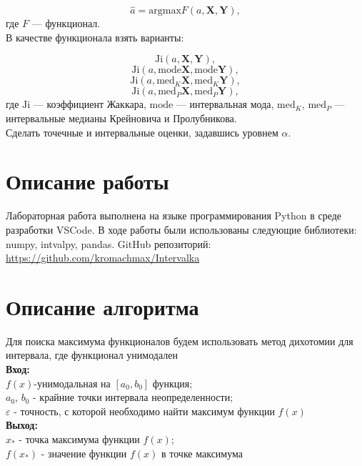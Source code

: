 \documentclass[10pt]{article}
\begin{document}
\begin{equation}
    \hat a = \text{argmax} F(a, \mathbf{X}, \mathbf{Y}),
\end{equation}
где \( F \) --- функционал.
\\
В качестве функционала взять варианты:

  \begin{equation} \label{eq:F_1}
    \text{Ji} (a, \mathbf{X}, \mathbf{Y}),
  \end{equation}
  \begin{equation} \label{eq:F_2}
    \text{Ji} (a, \text{mode} \mathbf{X}, \text{mode} \mathbf{Y}),
  \end{equation}
  \begin{equation} \label{eq:F_3}
    \text{Ji} (a, \text{med}_K \mathbf{X}, \text{med}_K \mathbf{Y}),
  \end{equation}
  \begin{equation} \label{eq:F_4}
    \text{Ji} (a, \text{med}_P \mathbf{X}, \text{med}_P \mathbf{Y}),
  \end{equation}
где \( \text{Ji} \) --- коэффициент Жаккара, \( \text{mode} \) --- интервальная мода, \( \text{med}_K \), \( \text{med}_P \) --- интервальные медианы Крейновича и Пролубникова.\\
Сделать точечные и интервальные оценки, задавшись уровнем \( \alpha \).


\section{Описание работы}

Лабораторная работа выполнена на языке программирования Python в среде разработки VSCode. В ходе работы были использованы следующие библиотеки: numpy, intvalpy, pandas. GitHub репозиторий: \url{https://github.com/kromachmax/Intervalka}

\section{Описание алгоритма}

Для поиска максимума функционалов будем использовать метод дихотомии для интервала, где функционал унимодален\\
\textbf{Вход:}
\\$f(x)$-унимодальная на $[a_0,b_0]$ функция;
\\$a_0$, $b_0$ - крайние точки интервала неопределенности;
\\$\varepsilon$ - точность, с которой необходимо найти максимум функции $f(x)$
\\
\textbf{Выход:}
\\$x_*$ - точка максимума функции $f(x)$;
\\$f(x_*)$ - значение функции $f(x)$ в точке максимума
\end{document}
